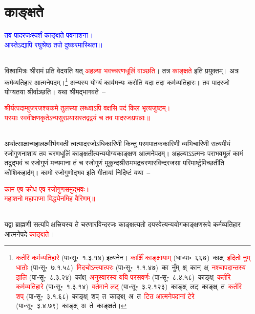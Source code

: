 \section[काङ्क्षते]{काङ्क्षते}
\centering\textcolor{blue}{तव पादरजःस्पर्शं काङ्क्षते पवनाशना।\nopagebreak\\
आस्तेऽद्यापि रघुश्रेष्ठ तपो दुष्करमास्थिता॥}\nopagebreak\\
\\
\fontsize{14}{21}\selectfont\begin{sloppypar}\justifying\noindent\hspace{10mm} विश्वामित्रः श्रीरामं प्रति वेदयति यत् \textcolor{red}{अहल्या भवच्चरण\-धूलिं वाञ्छति}। तत्र \textcolor{red}{काङ्क्षते} इति प्रयुक्तम्। अत्र कर्म\-व्यतिहार आत्मनेपदम्।\footnote{\textcolor{red}{कर्तरि कर्म\-व्यतिहारे} (पा॰सू॰~१.३.१४) इत्यनेन। \textcolor{red}{काक्षिँ काङ्क्षायाम्} (धा॰पा॰~६६७)~\arrow काक्ष्~\arrow \textcolor{red}{इदितो नुम् धातोः} (पा॰सू॰~७.१.५८)~\arrow \textcolor{red}{मिदचोऽन्त्यात्परः} (पा॰सू॰~१.१.४७)~\arrow का~नुँम्~क्ष्~\arrow कान्~क्ष्~\arrow \textcolor{red}{नश्चापदान्तस्य झलि} (पा॰सू॰~८.३.२४)~\arrow कांक्ष्~\arrow \textcolor{red}{अनुस्वारस्य ययि परसवर्णः} (पा॰सू॰~८.४.५८)~\arrow काङ्क्ष्~\arrow \textcolor{red}{कर्तरि कर्म\-व्यतिहारे} (पा॰सू॰~१.३.१४)~\arrow \textcolor{red}{वर्तमाने लट्} (पा॰सू॰~३.२.१२३)~\arrow काङ्क्ष्~लट्~\arrow काङ्क्ष्~त~\arrow \textcolor{red}{कर्तरि शप्‌} (पा॰सू॰~३.१.६८)~\arrow काङ्क्ष्~शप्~त~\arrow काङ्क्ष्~अ~त~\arrow \textcolor{red}{टित आत्मनेपदानां टेरे} (पा॰सू॰~३.४.७९)~\arrow काङ्क्ष्~अ~ते~\arrow काङ्क्षते।} अन्यस्य योग्यं कार्यमन्यः करोति यदा तदा कर्म\-व्यतिहारः। तव पाद\-रजो योग्यतया श्रीर्वाञ्छति। यथा श्रीमद्भागवते~–\end{sloppypar}
\centering\textcolor{red}{श्रीर्यत्पदाम्बुजरजश्चकमे तुलस्या लब्ध्वाऽपि वक्षसि पदं किल भृत्यजुष्टम्।\nopagebreak\\
यस्याः स्ववीक्षणकृतेऽन्यसुरप्रयासस्तद्वद्वयं च तव पादरजःप्रपन्नाः॥}\nopagebreak\\
\\
\fontsize{14}{21}\selectfont\begin{sloppypar}\justifying\noindent अर्थात्साक्षान्महा\-लक्ष्मीर्भगवती त्वत्पाद\-रजोऽधिकारिणी किन्तु परम\-पातक\-कारिणी व्यभिचारिणी सत्यपीयं रजो\-गुण\-नाशाय तव चरण\-धूलिं काङ्क्षतीत्यन्य\-योग्य\-काङ्क्षण आत्मनेपदम्। अहल्याऽऽत्मनः पराभव\-मूलं कामं तदुद्भवं च रजो\-गुणं मन्यमाना तं च रजो\-गुणं मुकुन्द\-श्रीराम\-भद्रचरणारविन्द\-रजसा परिमार्ष्टुमिच्छतीति कौशिक\-हार्दम्। कामो रजो\-गुणोद्भव इति गीतायां निर्दिष्टं यथा~–\end{sloppypar}
\centering\textcolor{red}{काम एष क्रोध एष रजोगुणसमुद्भवः।\nopagebreak\\
महाशनो महापाप्मा विद्ध्येनमिह वैरिणम्॥}\nopagebreak\\
\\
\fontsize{14}{21}\selectfont\begin{sloppypar}\justifying\noindent यद्वा ब्राह्मणी सत्यपि क्षत्त्रियस्य ते चरणारविन्द\-रजः काङ्क्षत्यतो दयस्वेत्यन्य\-योग\-काङ्क्षण\-रूपे कर्म\-व्यतिहार आत्मनेपदे \textcolor{red}{काङ्क्षते}।\end{sloppypar}
